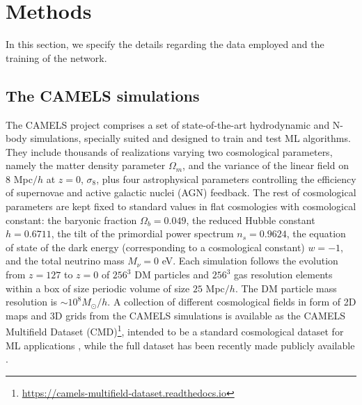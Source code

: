 \documentclass[twocolumn]{aastex631}
\begin{document}
\section{Methods}

\label{sec:methods}




In this section, we specify the details regarding the data employed and the training of the network. 

\subsection{The CAMELS simulations}
\label{sec:camels}

The CAMELS project \citep{villaescusanavarro2020camels, 2022arXiv220101300V} comprises a set of state-of-the-art hydrodynamic and N-body simulations, specially suited and designed to train and test ML algorithms. They include thousands of realizations varying two cosmological parameters, namely the matter density parameter $\Omega_m$, and the variance of the linear field on 8 Mpc$/h$ at $z=0$, $\sigma_8$, plus four astrophysical parameters controlling the efficiency of supernovae and active galactic nuclei (AGN) feedback. The rest of cosmological parameters are kept fixed to standard values in flat cosmologies with cosmological constant: the baryonic fraction $\Omega_b=0.049$, the reduced Hubble constant $h=0.6711$, the tilt of the primordial power spectrum $n_s=0.9624$, the equation of state of the dark energy (corresponding to a cosmological constant) $w=-1$, and the total neutrino mass $M_\nu=0$ eV. Each simulation follows the evolution from $z=127$ to $z=0$ of $256^3$ DM particles and $256^3$ gas resolution elements within a box of size periodic volume of size $25$ Mpc$/h$. The DM particle mass resolution is $\sim 10^8 M_\odot/h$. A collection of different cosmological fields in form of 2D maps and 3D grids from the CAMELS simulations is available as the CAMELS Multifield Dataset (CMD)\footnote{\url{https://camels-multifield-dataset.readthedocs.io}}, intended to be a standard cosmological dataset for ML applications \citep{2021arXiv210910915V}, while the full dataset has been recently made publicly available \citep{2022arXiv220101300V}.
\end{document}
